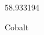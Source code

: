 \documentclass[12pt]{article}
\begin{document}
\hfill{}
\vfill
\begin{center}
  {\fontsize{50}{60}
  }

  58.933194

Cobalt
\end{center}
\vfill
\end{document}
